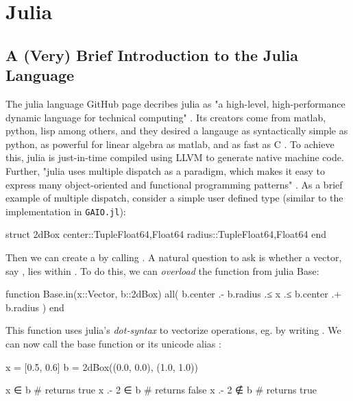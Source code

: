 \section{Julia}


\subsection{A (Very) Brief Introduction to the Julia Language}

The julia language GitHub page decribes julia as "a high-level, high-performance dynamic 
language for technical computing" \cite*{juliarepo}. Its creators come from matlab, python,
lisp among others, and they desired a langauge as syntactically simple as python, as 
powerful for linear algebra as matlab, and as fast as C \cite*{julia}. To achieve this,
julia is just-in-time compiled using LLVM to generate native machine code. Further, "julia uses 
multiple dispatch as a paradigm, which makes it easy to express many object-oriented and
functional programming patterns" \cite*{juliamain}. As a brief example of multiple dispatch,
consider a simple user defined type  (similar to the implementation in 
\texttt{GAIO.jl}):

\begin{jllisting}[language=julia, style=jlcodestyle]
    struct 2dBox
        center::Tuple{Float64,Float64}
        radius::Tuple{Float64,Float64}
    end
\end{jllisting}

Then we can create a  by calling . 
A natural question to ask is whether a vector, say , lies within 
. To do this, we can \emph{overload} the function  from julia Base:

\begin{jllisting}[language=julia, style=jlcodestyle]
    function Base.in(x::Vector, b::2dBox)
        all( b.center .- b.radius .≤ x .≤ b.center .+ b.radius )
    end
\end{jllisting}

This function uses julia's \emph{dot-syntax} to vectorize operations, eg. \jlinl{+}
by writing . We can now call the base function  or its unicode alias
:

\begin{jllisting}[language=julia, style=jlcodestyle]
    x = [0.5, 0.6]
    b = 2dBox((0.0, 0.0), (1.0, 1.0))

    x ∈ b           # returns true
    x .- 2 ∈ b      # returns false
    x .- 2 ∉ b      # returns true
\end{jllisting}

